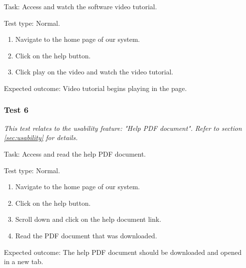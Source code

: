{\sffamily Task:} Access and watch the software video tutorial.\\

{\color{gray} \hrulefill}

{\sffamily Test type: Normal.}\\

\begin{enumerate}
  \item Navigate to the home page of our system.
  \item Click on the help button.
  \item Click play on the video and watch the video tutorial.
\end{enumerate}

{\sffamily Expected outcome:} Video tutorial begins playing in 
the page.

{\color{gray} \hrulefill}

\vspace{0.2cm}

\subsubsection{Test 6}

\textit{This test relates to the usability feature:
"Help PDF document". Refer to section
\ref{sec:usability} for details.} \\ \vspace{0.2cm}

{\sffamily Task:} Access and read the help PDF document.\\ 

{\color{gray} \hrulefill}

{\sffamily Test type: Normal.}\\

\begin{enumerate}
  \item Navigate to the home page of our system.
  \item Click on the help button.
  \item Scroll down and click on the help document link.
  \item Read the PDF document that was downloaded.
\end{enumerate}

{\sffamily Expected outcome:} The help PDF document should
be downloaded and opened in a new tab. \\

{\color{gray} \hrulefill}

\vspace{0.2cm}


